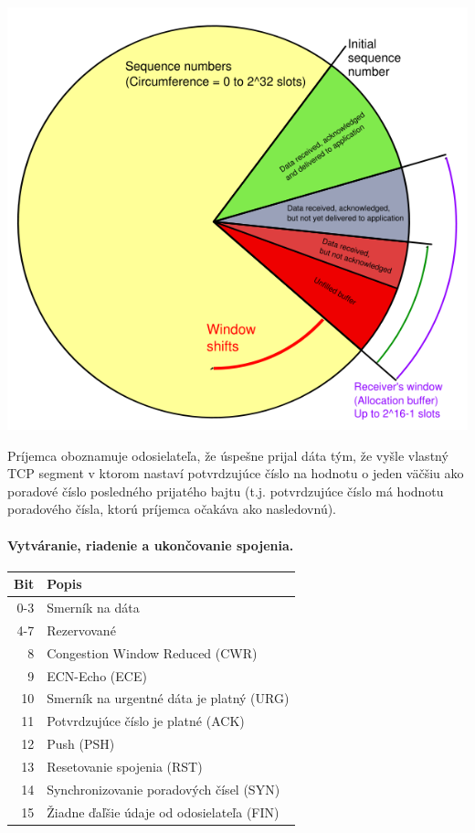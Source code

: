 \documentclass[10pt,a4paper]{article}
\begin{document}
\begin{center}
\includegraphics[scale=0.5]{tcp_window.png}
\end{center}

Príjemca oboznamuje odosielateľa, že úspešne prijal dáta tým, že vyšle vlastný TCP segment v ktorom nastaví potvrdzujúce číslo na hodnotu o jeden väčšiu ako poradové číslo posledného prijatého bajtu (t.j. potvrdzujúce číslo má hodnotu poradového čísla, ktorú príjemca očakáva ako nasledovnú).

\paragraph{Vytváranie, riadenie a ukončovanie spojenia.} 

\begin{center}
\begin{tabular}{ r | l }       
  Bit & Popis\\
\hline              
  0-3 & Smerník na dáta\\              
  4-7 & Rezervované\\              
  8 & Congestion Window Reduced (CWR)\\              
  9 & ECN-Echo (ECE)\\              
  10 & Smerník na urgentné dáta je platný (URG)\\              
  11 & Potvrdzujúce číslo je platné (ACK)\\              
  12 & Push (PSH)\\           
  13 & Resetovanie spojenia (RST)\\           
  14 & Synchronizovanie poradových čísel (SYN)\\           
  15 & Žiadne ďaľšie údaje od odosielateľa (FIN)\\
\end{tabular}
\end{center}
\end{document}
